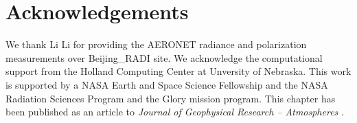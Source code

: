 \section{Acknowledgements}

We thank Li Li for providing the AERONET radiance and polarization
measurements over Beijing\_RADI site. We acknowledge the computational
support from the Holland Computing Center at Unversity of Nebraska.
This work is supported by a NASA Earth and Space Science
Fellowship and the NASA Radiation Sciences Program and the Glory mission
program. This chapter has been published as an article to
\textit{Journal of Geophysical Research – Atmospheres} \citep{Xu15b}.
